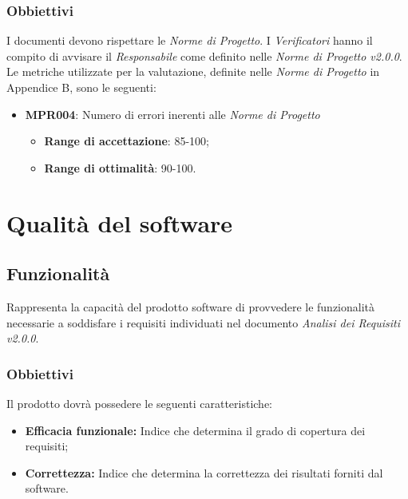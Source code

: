 \subsubsection{Obbiettivi}
I documenti devono rispettare le \textit{Norme di Progetto}. I \textit{Verificatori} hanno il compito di avvisare il \textit{Responsabile} come definito nelle \textit{Norme di Progetto v2.0.0}.\\
Le metriche utilizzate per la valutazione, definite nelle \textit{Norme di Progetto} in Appendice B, sono le seguenti:
\begin{itemize}
	\item \textbf{MPR004}: Numero di errori inerenti alle \textit{Norme di Progetto}
	\begin{itemize}
		\item \textbf{Range di accettazione}: 85-100;
		\item \textbf{Range di ottimalità}: 90-100.
	\end{itemize}
\end{itemize}

\section{Qualità del software}
\label{software}

\subsection{Funzionalità}
Rappresenta la capacità del prodotto software di provvedere le funzionalità necessarie a soddisfare i requisiti individuati nel documento \textit{Analisi dei Requisiti v2.0.0}. 
\subsubsection{Obbiettivi }Il prodotto dovrà possedere le seguenti caratteristiche:
\begin{itemize}
	\item \textbf{Efficacia funzionale:} Indice che determina il grado di copertura dei requisiti;
	\item \textbf{Correttezza:} Indice che determina la correttezza dei risultati forniti dal software.
\end{itemize}

